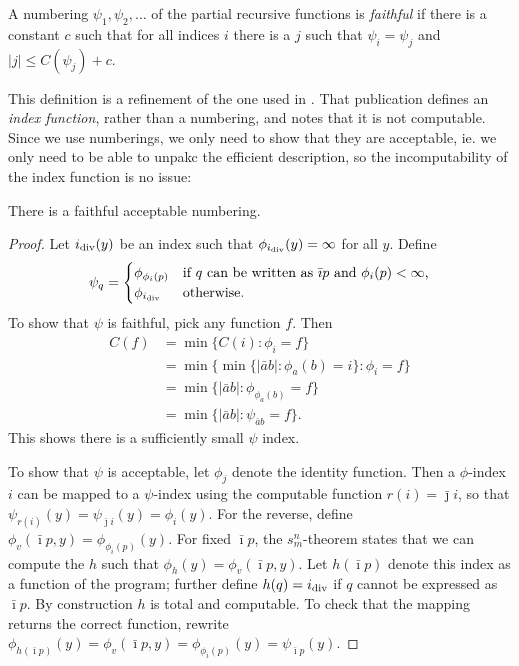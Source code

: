 \documentclass{style/llncs}
\newcommand{\tn}[1]{\textnormal{#1}}
\begin{document}
\begin{definition}\label{def:faithful}
  A numbering $\psi_1,\psi_2,\ldots$ of the partial recursive
  functions is \emph{faithful} if there is a constant $c$ such that
  for all indices $i$ there is a $j$ such that $\psi_i=\psi_j$ and
  $|j|\le C(\psi_j)+c$.
\end{definition}
This definition is a refinement of the one used in \cite{adriaans2012facticity}. That publication defines an \emph{index function}, rather than a numbering, and notes that it is not computable. Since we use numberings, we only need to show that they are acceptable, ie. we only need to be able to unpakc the efficient description, so the incomputability of the index function is no issue:
\begin{lemma}
  There is a faithful acceptable numbering.
\end{lemma}
\begin{proof}
Let $i_\tn{div}(y)$ be an index such that $\phi_{i_\tn{div}}(y)=\infty$ for all $y$. Define
  \[\psi_q=\begin{cases}
    \phi_{\phi_i(p)}&\tn{if $q$ can be written as $\bar\imath p$ and $\phi_i(p)<\infty$,}\\
    \phi_{i_\tn{div}}&\tn{otherwise.}\end{cases}
  \]
  To show that $\psi$ is faithful, pick any function $f$. Then
\[\begin{split}
C(f)&=\min\{C(i):\phi_i=f\}\\
&=\min\{\min\{|\bar a b|:\phi_a(b)=i\}:\phi_i=f\}\\
&=\min\{|\bar a b|:\phi_{\phi_a(b)}=f\}\\
&=\min\{|\bar a b|:\psi_{\bar a b}=f\}.
\end{split}\]
This shows there is a sufficiently small $\psi$ index.

To show that $\psi$ is acceptable, let $\phi_j$ denote the identity
function. Then a $\phi$-index $i$ can be mapped to a $\psi$-index
using the computable function $r(i)=\bar\jmath i$, so that
$\psi_{r(i)}(y)=\psi_{\bar\jmath i}(y)=\phi_i(y)$. For the reverse,
define $\phi_v(\bar\imath p, y)=\phi_{\phi_i(p)}(y)$. For fixed
$\bar\imath p$, the 
$s^n_m$-theorem \cite{kleene193notation} states that we can compute the $h$
such that $\phi_h(y)=\phi_v(\bar\imath p,y)$. Let $h(\bar\imath p)$
denote this index as a function of the program; further define
$h(q)=i_\tn{div}$ if $q$ cannot be expressed as $\bar\imath p$. By
construction $h$ is total and computable. To check that the mapping
returns the correct function, rewrite $\phi_{h(\bar\imath
  p)}(y)=\phi_v(\bar\imath p,y)=\phi_{\phi_i(p)}(y)=\psi_{\bar\imath p}(y)$.
\end{proof}
\end{document}
